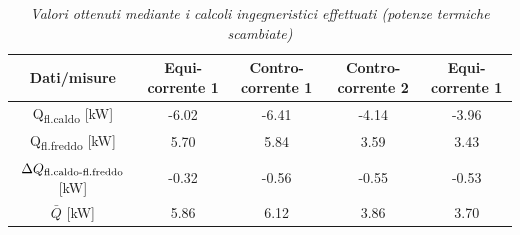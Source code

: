 \documentclass[a4paper,10pt]{article}                                                                                       %
\begin{document}
\begin{table}[H]                                                                                                            %
  \caption{\textit{Valori ottenuti mediante i calcoli ingegneristici effettuati (potenze termiche scambiate)}}              %
  \label{tab:heat_tr_calcs}                                                                                                 %
  \vspace{3mm}                                                                                                              %
  \centering                                                                                                                %
  \begin{tabular}{||c|c|c|c|c||}                                                                                            %
    \hline
    Dati/misure                                         & Equi-corrente 1 & Contro-corrente 1 & Contro-corrente 2 & Equi-corrente 1 \\
    \hline\hline
    Q\textsubscript{fl.caldo} [kW]                      & -6.02           & -6.41             & -4.14             & -3.96           \\
    Q\textsubscript{fl.freddo} [kW]                     & 5.70            & 5.84              & 3.59              & 3.43            \\
    $\Delta{Q\textsubscript{fl.caldo-fl.freddo}}$ [kW]  & -0.32           & -0.56             & -0.55             & -0.53           \\
    $\bar{Q}$ [kW]                                      & 5.86            & 6.12              & 3.86              & 3.70            \\
    \hline
  \end{tabular}                                                                                                             %
\end{table}                                                                                                                 %
\end{document}
